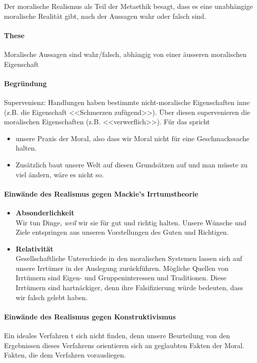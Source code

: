 \documentclass[../main.tex]{subfiles}
\begin{document}
 

\begin{warningbox}
Der moralische Realismus als Teil der Metaethik besagt, dass es eine unabhängige moralische Realität gibt, nach der Aussagen wahr oder falsch sind.
\end{warningbox}

\paragraph{These} Moralische Aussagen sind wahr/falsch, abhängig von einer äusseren moralischen Eigenschaft

\paragraph{Begründung} Supervenienz: Handlungen haben bestimmte nicht-moralische Eigenschaften inne (z.B. die Eigenschaft <<Schmerzen zufügend>>). Über diesen supervenieren die moralischen Eigenschaften (z.B. <<verwerflich>>). Für das spricht
\begin{itemize}
  \item unsere Praxis der Moral, also dass wir Moral nicht für eine Geschmackssache halten.
  \item Zusätzlich baut unsere Welt auf diesen Grundsätzen auf und man müsste zu viel ändern, wäre es nicht so. 
\end{itemize} 

\paragraph{Einwände des Realismus gegen Mackie's Irrtumstheorie} 
\begin{itemize}
  \item \textbf{Absonderlichkeit} \\ Wir tun Dinge, \textit{weil} wir sie für gut und richtig halten. Unsere Wünsche und Ziele entspringen aus unseren Vorstellungen des Guten und Richtigen.
  \item \textbf{Relativität} \\ Gesellschaftliche Unterschiede in den moralischen Systemen lassen sich auf unsere Irrtümer in der Auslegung zurückführen. Mögliche Quellen von Irrtümern sind Eigen- und Gruppeninteressen und Traditionen. Diese Irrtümern sind hartnäckiger, denn ihre Falsifizierung würde bedeuten, dass wir falsch gelebt haben. 
\end{itemize}

\paragraph{Einwände des Realismus gegen Konstruktivismus} Ein ideales Verfahren t sich nicht finden, denn unsere Beurteilung von den Ergebnissen dieses Verfahrens orientieren sich an geglaubten Fakten der Moral. Fakten, die dem Verfahren vorausliegen.
\end{document}
